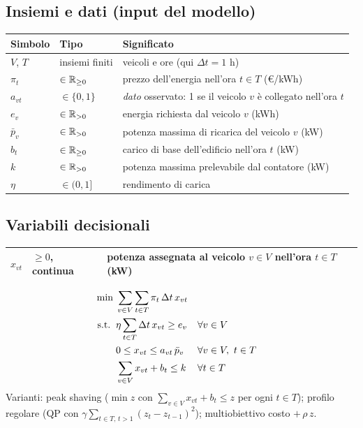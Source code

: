 \subsection*{Insiemi e dati (input del modello)}
\begin{center}\small
\begin{tabular}{llp{7.2cm}}
\toprule
Simbolo & Tipo & Significato \\
\midrule
$V$, $T$ & insiemi finiti & veicoli e ore (qui $\Delta t = 1$ h) \\
$\pi_t$ & $\in \mathbb{R}_{\ge 0}$ & prezzo dell'energia nell'ora $t \in T$ (\euro/kWh) \\
$a_{vt}$ & $\in \{0, 1\}$ & \emph{dato} osservato: 1 se il veicolo $v$ è collegato nell'ora $t$ \\
$e_v$ & $\in \mathbb{R}_{> 0}$ & energia richiesta dal veicolo $v$ (kWh) \\
$\bar p_v$ & $\in \mathbb{R}_{> 0}$ & potenza massima di ricarica del veicolo $v$ (kW) \\
$b_t$ & $\in \mathbb{R}_{\ge 0}$ & carico di base dell'edificio nell'ora $t$ (kW) \\
$k$ & $\in \mathbb{R}_{> 0}$ & potenza massima prelevabile dal contatore (kW) \\
$\eta$ & $\in (0, 1]$ & rendimento di carica \\
\bottomrule
\end{tabular}
\end{center}

\subsection*{Variabili decisionali}
\begin{center}\small
\begin{tabular}{llp{7.2cm}}
\toprule
$x_{vt}$ & $\ge 0$, continua & potenza assegnata al veicolo $v \in V$ nell'ora $t \in T$ (kW) \\
\bottomrule
\end{tabular}
\end{center}

\begin{modello}
\begin{align}
\min\;& \sum_{v \in V}\sum_{t \in T} \pi_t\, \Delta t\, x_{vt} \notag\\
\text{s.t.}\;\;
& \eta \sum_{t \in T} \Delta t\, x_{vt} \ge e_v && \forall v \in V \label{eq:energia}\\
& 0 \le x_{vt} \le a_{vt}\, \bar p_v && \forall v \in V,\ t \in T \label{eq:potenza}\\
& \sum_{v \in V} x_{vt} + b_t \le k && \forall t \in T \label{eq:rete}
\end{align}
Varianti: peak shaving ($\min z$ con $\sum_{v \in V} x_{vt} + b_t \le z$ per ogni
$t \in T$); profilo regolare (QP con $\gamma \sum_{t \in T,\, t > 1} (z_t - z_{t-1})^2$);
multiobiettivo costo $+\,\rho\,z$.
\end{modello}


